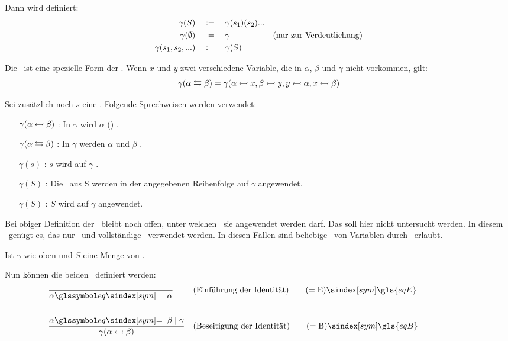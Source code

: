 {Dann wird definiert:
\begin{align}
	\gamma(S) & \quad := \quad \gamma(s_1)(s_2)... \label{def:SubstitutionenAlt}\\
	\gamma(\emptyset) & \quad \; = \quad \gamma & \text{(nur zur Verdeutlichung)}\\
	\gamma(s_1,s_2,...) & \quad := \quad \gamma(S)
\end{align}

Die \Vertauschung\ ist eine spezielle Form der \Substitution.
Wenn $x$ und $y$ zwei verschiedene Variable, die in $\alpha$, $\beta$ und $\gamma$ nicht vorkommen, gilt:
\[
	\gamma(\alpha \leftrightarrows \beta) = \gamma(\alpha\leftarrowtail x, \beta\leftarrowtail y,  y\leftarrowtail\alpha, x \leftarrowtail\beta)
\]

Sei zusätzlich noch $s$ eine \Substitution.
Folgende Sprechweisen werden verwendet:
\begin{itemize}
	\renewcommand*{\itemindent}{1,5cm}
	\renewcommand*{\labelsep}{5pt}
	\item [$\gamma(\alpha \leftarrowtail \beta)$ :] In $\gamma$ wird $\alpha$ () .
	\item [$\gamma(\alpha \leftrightarrows \beta)$ :] In $\gamma$ werden $\alpha$ und $\beta$ .
	\item [$\gamma(s)$ :] $s$ wird auf $\gamma$ .
	\item [$\gamma(S)$ :] Die \Substitutionen\ aus S werden in der angegebenen Reihenfolge auf $\gamma$ angewendet.
	\item [$\gamma(S)$ :] $S$ wird auf $\gamma$ angewendet.
\end{itemize}
%
Bei obiger Definition der \Substitution\ bleibt noch offen, unter welchen \Voraussetzungen\ sie angewendet werden darf. Das soll hier nicht untersucht werden. In diesem \sectionname\ genügt es, das nur \Vertauschung\ und vollständige \Substitution\ verwendet werden.
In diesen Fällen sind beliebige \Substitutionen\ von Variablen durch \Formeln\ erlaubt.

Ist $\gamma$ wie oben und $S$ eine Menge von \Substitutionen.

Nun können die beiden \Identitaetsregeln\ definiert werden:
\begin{align}
	& \frac{}{\alpha\symeq\alpha}
	& & (\text{Einführung der Identität})
	\tag{\eqE} \sym{\gls{eqE}} \label{def:eqE}
	\\\\
	& \frac{\alpha\symeq\beta \srand \gamma}{\gamma(\alpha\subst\beta)}
	& & (\text{Beseitigung der Identität})
	\tag{\eqB} \sym{\gls{eqB}} \label{def:eqB}
	\formulatoleft
\end{align}

}
